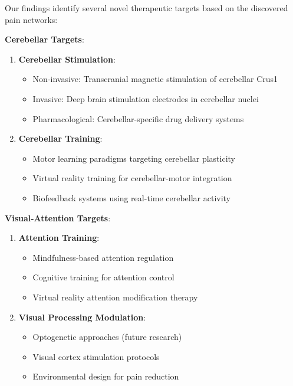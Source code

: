 \documentclass[10pt,journal,compsoc]{IEEEtran}
\begin{document}
Our findings identify several novel therapeutic targets based on the discovered pain networks:

\textbf{Cerebellar Targets}:

\begin{enumerate}
\item \textbf{Cerebellar Stimulation}:
   \begin{itemize}
   \item Non-invasive: Transcranial magnetic stimulation of cerebellar Crus1
   \item Invasive: Deep brain stimulation electrodes in cerebellar nuclei
   \item Pharmacological: Cerebellar-specific drug delivery systems
   \end{itemize}

\item \textbf{Cerebellar Training}:
   \begin{itemize}
   \item Motor learning paradigms targeting cerebellar plasticity
   \item Virtual reality training for cerebellar-motor integration
   \item Biofeedback systems using real-time cerebellar activity
   \end{itemize}
\end{enumerate}

\textbf{Visual-Attention Targets}:

\begin{enumerate}
\item \textbf{Attention Training}:
   \begin{itemize}
   \item Mindfulness-based attention regulation
   \item Cognitive training for attention control
   \item Virtual reality attention modification therapy
   \end{itemize}

\item \textbf{Visual Processing Modulation}:
   \begin{itemize}
   \item Optogenetic approaches (future research)
   \item Visual cortex stimulation protocols
   \item Environmental design for pain reduction
   \end{itemize}
\end{enumerate}
\end{document}
